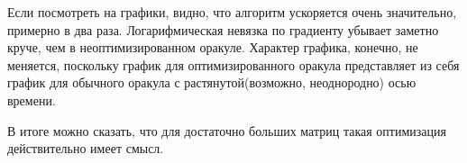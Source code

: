 \documentclass[notitlepage]{article}
\begin{document}
Если посмотреть на графики, видно, что алгоритм ускоряется очень значительно, примерно в два раза.
Логарифмическая невязка по градиенту убывает заметно круче, чем в неоптимизированном оракуле.
Характер графика, конечно, не меняется, поскольку график для оптимизированного оракула представляет из себя график для обычного оракула
с растянутой(возможно, неоднородно) осью времени.

В итоге можно сказать, что для достаточно больших матриц такая оптимизация действительно имеет смысл.


			
			
\end{document}

